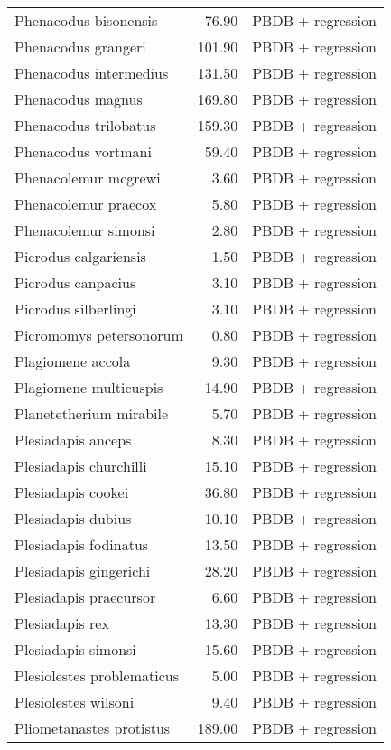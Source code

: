 \begin{table}[ht]
\begin{tabular}{lrl}
  Phenacodus bisonensis & 76.90 & PBDB + regression \\ 
  Phenacodus grangeri & 101.90 & PBDB + regression \\ 
  Phenacodus intermedius & 131.50 & PBDB + regression \\ 
  Phenacodus magnus & 169.80 & PBDB + regression \\ 
  Phenacodus trilobatus & 159.30 & PBDB + regression \\ 
  Phenacodus vortmani & 59.40 & PBDB + regression \\ 
  Phenacolemur mcgrewi & 3.60 & PBDB + regression \\ 
  Phenacolemur praecox & 5.80 & PBDB + regression \\ 
  Phenacolemur simonsi & 2.80 & PBDB + regression \\ 
  Picrodus calgariensis & 1.50 & PBDB + regression \\ 
  Picrodus canpacius & 3.10 & PBDB + regression \\ 
  Picrodus silberlingi & 3.10 & PBDB + regression \\ 
  Picromomys petersonorum & 0.80 & PBDB + regression \\ 
  Plagiomene accola & 9.30 & PBDB + regression \\ 
  Plagiomene multicuspis & 14.90 & PBDB + regression \\ 
  Planetetherium mirabile & 5.70 & PBDB + regression \\ 
  Plesiadapis anceps & 8.30 & PBDB + regression \\ 
  Plesiadapis churchilli & 15.10 & PBDB + regression \\ 
  Plesiadapis cookei & 36.80 & PBDB + regression \\ 
  Plesiadapis dubius & 10.10 & PBDB + regression \\ 
  Plesiadapis fodinatus & 13.50 & PBDB + regression \\ 
  Plesiadapis gingerichi & 28.20 & PBDB + regression \\ 
  Plesiadapis praecursor & 6.60 & PBDB + regression \\ 
  Plesiadapis rex & 13.30 & PBDB + regression \\ 
  Plesiadapis simonsi & 15.60 & PBDB + regression \\ 
  Plesiolestes problematicus & 5.00 & PBDB + regression \\ 
  Plesiolestes wilsoni & 9.40 & PBDB + regression \\ 
  Pliometanastes protistus & 189.00 & PBDB + regression \\ 

\end{tabular}
\end{table}
